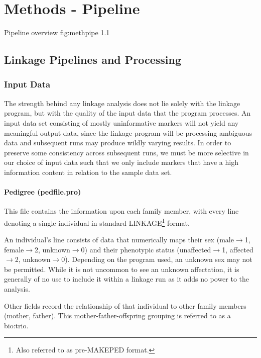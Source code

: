 \chapter{Methods - Pipeline}

	{Pipeline overview}
	{fig:methpipe}
	{1.1}{}

\section{Linkage Pipelines and Processing}



\subsection{Input Data}

The strength behind any linkage analysis does not lie solely with the linkage program, but with the quality of the input data that the program processes. An input data set consisting of mostly uninformative markers will not yield any meaningful output data, since the linkage program will be processing ambiguous data and subsequent runs may produce wildly varying results. In order to preserve some consistency across subsequent runs, we must be more selective in our choice of input data such that we only include markers that have a high information content in relation to the sample data set.

\subsubsection{Pedigree (pedfile.pro)}

This file contains the information upon each family member, with every line denoting a single individual in standard LINKAGE\footnote{Also referred to as pre-MAKEPED format.} format. 

An individual's line consists of data that numerically maps their sex ({male\(\rightarrow\)1, female\(\rightarrow\)2,  unknown\(\rightarrow\)0}) and their phenotypic status ({unaffected\(\rightarrow\)1, affected\(\rightarrow\)2,  unknown\(\rightarrow\)0}). Depending on the program used, an unknown sex may not be permitted. While it is not uncommon to see an unknown affectation, it is generally of no use to include it within a linkage run as it adds no power to the analysis. 

Other fields record the relationship of that individual to other family members (mother, father). This mother-father-offspring grouping is referred to as a \gls{bio:trio}. 

